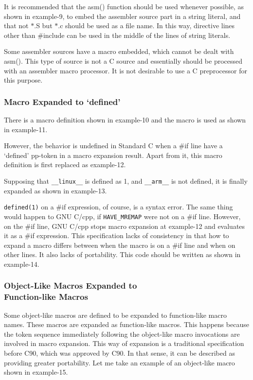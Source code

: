 \documentclass[twocolumn]{article}
\begin{document}
It is recommended that the asm() function should be used whenever possible, as shown in example-9, to embed the assembler source part in a string literal, and that not $*$.S but $*$.c should be used as a file name.  In this way, directive lines other than \#include can be used in the middle of the lines of string literals.

Some assembler sources have a macro embedded, which cannot be dealt with asm().  This type of source is not a C source and essentially should be processed with an assembler macro processor.  It is not desirable to use a C preprocessor for this purpose.

\subsubsection{Macro Expanded to `defined'}

There is a macro definition shown in example-10 and the macro is used as shown in example-11.

However, the behavior is undefined in Standard C when a \#if line have a `defined' pp-token in a macro expansion result.  Apart from it, this macro definition is first replaced as example-12.

Supposing that \verb|__linux__| is defined as 1, and \verb|__arm__| is not defined, it is finally expanded as shown in example-13.

\verb|defined(1)| on a \#if expression, of course, is a syntax error.  The same thing would happen to GNU C/cpp, if \verb|HAVE_MREMAP| were not on a \#if line.  However, on the \#if line, GNU C/cpp stops macro expansion at example-12 and evaluates it as a \#if expression.  This specification lacks of consistency in that how to expand a macro differs between when the macro is on a \#if line and when on other lines.  It also lacks of portability.  This code should be written as shown in example-14.

\subsubsection{Object-Like Macros Expanded to \\
Function-like Macros}

Some object-like macros are defined to be expanded to function-like macro names.  These macros are expanded as function-like macros.  This happens because the token sequence immediately following the object-like macro invocations are involved in macro expansion.  This way of expansion is a traditional specification before C90, which was approved by C90.  In that sense, it can be described as providing greater portability.  Let me take an example of an object-like macro shown in example-15.
\end{document}
